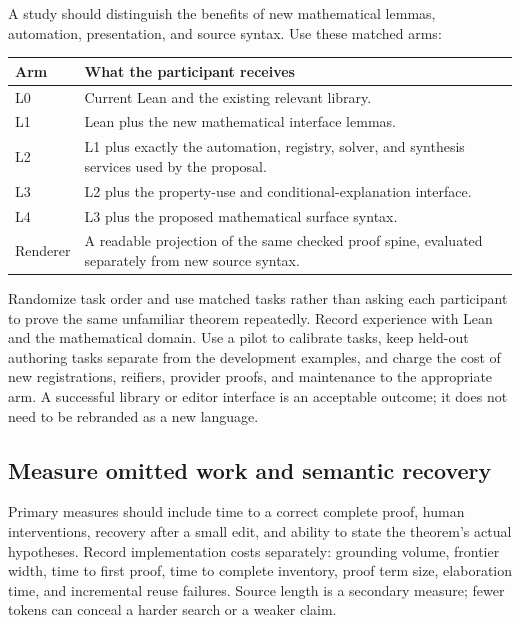 \documentclass[11pt,letterpaper]{article}
\theoremstyle{definition}\newtheorem{definition}[proposition]{Definition}
\theoremstyle{remark}\newtheorem{remark}[proposition]{Remark}
\begin{document}
A study should distinguish the benefits of new mathematical lemmas, automation,
presentation, and source syntax. Use these matched arms:
\begin{center}\small
\begin{tabularx}{\textwidth}{@{}P{0.11\textwidth}Y@{}}
\toprule Arm & What the participant receives\\\midrule
L0 & Current Lean and the existing relevant library.\\
L1 & Lean plus the new mathematical interface lemmas.\\
L2 & L1 plus exactly the automation, registry, solver, and synthesis services used by the proposal.\\
L3 & L2 plus the property-use and conditional-explanation interface.\\
L4 & L3 plus the proposed mathematical surface syntax.\\
Renderer & A readable projection of the same checked proof spine, evaluated separately from new source syntax.\\
\bottomrule
\end{tabularx}
\end{center}
Randomize task order and use matched tasks rather than asking each participant
to prove the same unfamiliar theorem repeatedly. Record experience with Lean
and the mathematical domain. Use a pilot to calibrate tasks, keep held-out
authoring tasks separate from the development examples, and charge the cost
of new registrations, reifiers, provider proofs, and maintenance to the
appropriate arm. A successful library or editor interface is
an acceptable outcome; it does not need to be rebranded as a new language.

\subsection{Measure omitted work and semantic recovery}

Primary measures should include time to a correct complete proof, human
interventions, recovery after a small edit, and ability to state the theorem's
actual hypotheses. Record implementation costs separately: grounding volume,
frontier width, time to first proof, time to complete inventory, proof term
size, elaboration time, and incremental reuse failures. Source length is a
secondary measure; fewer tokens can conceal a harder search or a weaker claim.
\end{document}

